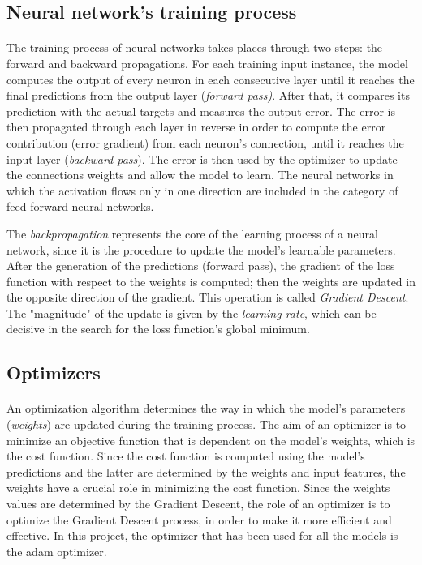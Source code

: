 \subsection{Neural network's training process}
\paragraph{} The training process of neural networks takes places through two steps: the forward and backward propagations. For each training input instance, the model computes the output of every neuron in each consecutive layer until it reaches the final predictions from the output layer (\textit{forward pass)}. After that, it compares its prediction with the actual targets and measures the output error. The error is then propagated through each layer in reverse in order to compute the error contribution (error gradient) from each neuron's connection, until it reaches the input layer (\textit{backward pass}). The error is then used by the optimizer to update the connections weights and allow the model to learn. The neural networks in which the activation flows only in one direction are included in the category of feed-forward neural networks.

The \textit{backpropagation} represents the core of the learning process of a neural network, since it is the procedure to update the model's learnable parameters. After the generation of the predictions (forward pass), the gradient of the loss function with respect to the weights is computed; then the weights are updated in the opposite direction of the gradient. This operation is called \textit{Gradient Descent}. The "magnitude" of the update is given by the \textit{learning rate}, which can be decisive in the search for the loss function's global minimum.


\subsection{Optimizers}
\paragraph{} An optimization algorithm determines the way in which the model's parameters (\textit{weights}) are updated during the training process. The aim of an optimizer is to minimize an objective function that is dependent on the model's weights, which is the cost function. Since the cost function is computed using the model's predictions and the latter are determined by the weights and input features, the weights have a crucial role in minimizing the cost function. Since the weights values are determined by the Gradient Descent, the role of an optimizer is to optimize the Gradient Descent process, in order to make it more efficient and effective. In this project, the optimizer that has been used for all the models is the \acf{adam} optimizer.

